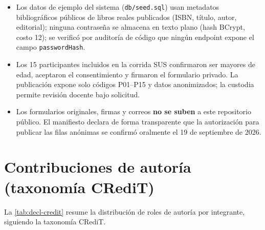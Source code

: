 \begin{itemize}[leftmargin=1.2cm]
  \item Los datos de ejemplo del sistema (\texttt{db/seed.sql}) usan
    metadatos bibliográficos públicos de libros reales publicados (ISBN,
    título, autor, editorial); ninguna contraseña se almacena en texto
    plano (hash BCrypt, costo 12); se verificó por auditoría de código
    que ningún endpoint expone el campo \texttt{passwordHash}.
  \item Los 15 participantes incluidos en la corrida SUS confirmaron ser
    mayores de edad, aceptaron el consentimiento y firmaron el formulario
    privado. La publicación expone solo códigos P01--P15 y datos
    anonimizados; la custodia permite revisión docente bajo solicitud.
  \item Los formularios originales, firmas y correos \textbf{no se
    suben} a este repositorio público. El manifiesto declara de forma
    transparente que la autorización para publicar las filas anónimas se
    confirmó oralmente el 19 de septiembre de 2026.
\end{itemize}

\section{Contribuciones de autoría (taxonomía CRediT)}

La \autoref{tab:decl-credit} resume la distribución de roles de
autoría por integrante, siguiendo la taxonomía CRediT.

